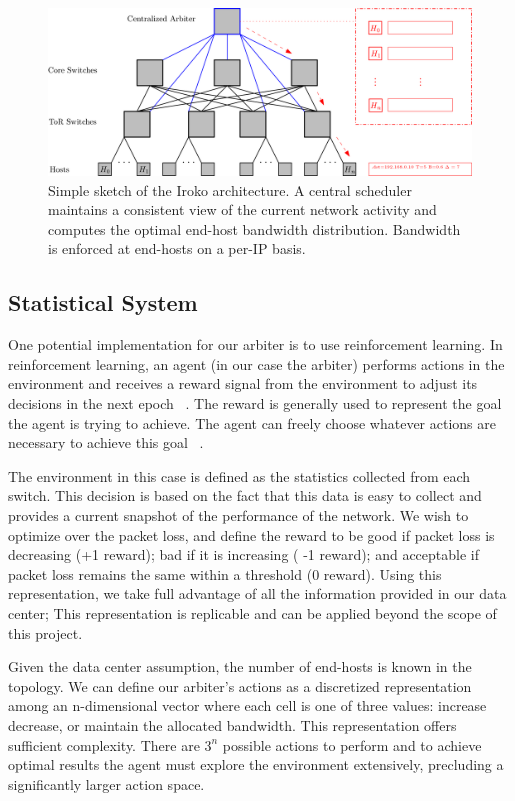 \begin{figure}
\centering
\includegraphics[width=1\linewidth]{Topology3}
\caption{Simple sketch of the Iroko architecture. A central scheduler maintains 
a consistent view of the current network activity and computes the optimal 
end-host bandwidth distribution. Bandwidth is enforced at end-hosts on a per-IP 
basis.}
\label{fig:Topology3}
\end{figure}

\subsection{Statistical System}
One potential implementation for our arbiter is to use reinforcement learning. 
In reinforcement learning, an agent (in our case the arbiter) performs actions 
in the environment and receives a reward signal from the environment to adjust 
its decisions in the next epoch ~\cite{Sutton:1998:IRL:551283}. The reward is 
generally used to represent the goal the agent is trying to achieve. The agent 
can freely choose whatever actions are necessary to achieve this goal 
~\cite{Sutton:1998:IRL:551283}.

The environment in this case is defined as the statistics collected from each 
switch. This decision is based on the fact that this data is easy to collect 
and provides a current snapshot of the performance of the network. We wish to 
optimize over the packet loss, and define the reward to be good if packet loss 
is decreasing (+1 reward); bad if it is increasing ( -1 reward); and acceptable 
if packet loss remains the same within a threshold (0 reward). Using this 
representation, we take full advantage of all the information provided in our 
data center; This representation is replicable and can be applied beyond the 
scope of this project.
 
Given the data center assumption, the number of end-hosts is known in the 
topology. We can define our arbiter's actions as a discretized representation 
among an n-dimensional vector where each cell is one of three values: increase 
decrease, or maintain the allocated bandwidth. This representation offers 
sufficient complexity. There are $3^n$ possible actions to perform and to 
achieve optimal results the agent must explore the environment extensively, 
precluding a significantly larger action space.

